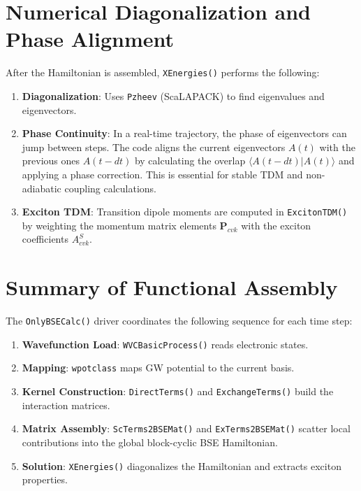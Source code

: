 \documentclass{article}
\begin{document}
\section{Numerical Diagonalization and Phase Alignment}
After the Hamiltonian is assembled, \texttt{XEnergies()} performs the following:
\begin{enumerate}
    \item \textbf{Diagonalization}: Uses \texttt{Pzheev} (ScaLAPACK) to find eigenvalues and eigenvectors.
    \item \textbf{Phase Continuity}: In a real-time trajectory, the phase of eigenvectors can jump between steps. The code aligns the current eigenvectors $A(t)$ with the previous ones $A(t-dt)$ by calculating the overlap $\langle A(t-dt) | A(t) \rangle$ and applying a phase correction. This is essential for stable TDM and non-adiabatic coupling calculations.
    \item \textbf{Exciton TDM}: Transition dipole moments are computed in \texttt{ExcitonTDM()} by weighting the momentum matrix elements $\mathbf{P}_{cvk}$ with the exciton coefficients $A^S_{cvk}$.
\end{enumerate}

\section{Summary of Functional Assembly}
The \texttt{OnlyBSECalc()} driver coordinates the following sequence for each time step:
\begin{enumerate}
    \item \textbf{Wavefunction Load}: \texttt{WVCBasicProcess()} reads electronic states.
    \item \textbf{Mapping}: \texttt{wpotclass} maps GW potential to the current basis.
    \item \textbf{Kernel Construction}: \texttt{DirectTerms()} and \texttt{ExchangeTerms()} build the interaction matrices.
    \item \textbf{Matrix Assembly}: \texttt{ScTerms2BSEMat()} and \texttt{ExTerms2BSEMat()} scatter local contributions into the global block-cyclic BSE Hamiltonian.
    \item \textbf{Solution}: \texttt{XEnergies()} diagonalizes the Hamiltonian and extracts exciton properties.
\end{enumerate}
\end{document}
